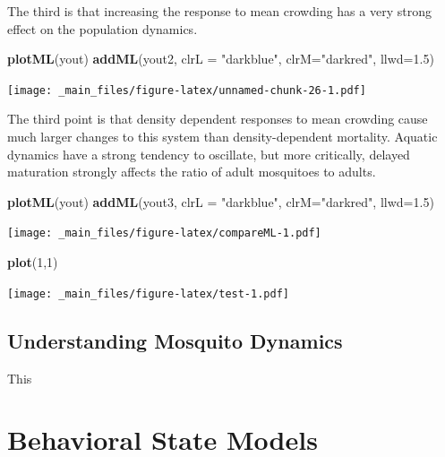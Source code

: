 \documentclass[
]{book}
\newenvironment{Shaded}{\begin{snugshade}}{\end{snugshade}}
\newcommand{\AttributeTok}[1]{\textcolor[rgb]{0.13,0.29,0.53}{#1}}
\newcommand{\DecValTok}[1]{\textcolor[rgb]{0.00,0.00,0.81}{#1}}
\newcommand{\FloatTok}[1]{\textcolor[rgb]{0.00,0.00,0.81}{#1}}
\newcommand{\FunctionTok}[1]{\textcolor[rgb]{0.13,0.29,0.53}{\textbf{#1}}}
\newcommand{\NormalTok}[1]{#1}
\newcommand{\StringTok}[1]{\textcolor[rgb]{0.31,0.60,0.02}{#1}}
\begin{document}
The third is that increasing the response to mean crowding has a very strong effect on the population dynamics.

\begin{Shaded}
\begin{Highlighting}[]
\FunctionTok{plotML}\NormalTok{(yout)}
\FunctionTok{addML}\NormalTok{(yout2, }\AttributeTok{clrL =} \StringTok{"darkblue"}\NormalTok{, }\AttributeTok{clrM=}\StringTok{"darkred"}\NormalTok{, }\AttributeTok{llwd=}\FloatTok{1.5}\NormalTok{)}
\end{Highlighting}
\end{Shaded}

\texttt{[image: \_main\_files/figure-latex/unnamed-chunk-26-1.pdf]}

The third point is that density dependent responses to mean crowding cause much larger changes to this system than density-dependent mortality. Aquatic dynamics have a strong tendency to oscillate, but more critically, delayed maturation strongly affects the ratio of adult mosquitoes to adults.

\begin{Shaded}
\begin{Highlighting}[]
\FunctionTok{plotML}\NormalTok{(yout)}
\FunctionTok{addML}\NormalTok{(yout3, }\AttributeTok{clrL =} \StringTok{"darkblue"}\NormalTok{, }\AttributeTok{clrM=}\StringTok{"darkred"}\NormalTok{, }\AttributeTok{llwd=}\FloatTok{1.5}\NormalTok{)}
\end{Highlighting}
\end{Shaded}

\texttt{[image: \_main\_files/figure-latex/compareML-1.pdf]}

\begin{Shaded}
\begin{Highlighting}[]
\FunctionTok{plot}\NormalTok{(}\DecValTok{1}\NormalTok{,}\DecValTok{1}\NormalTok{)}
\end{Highlighting}
\end{Shaded}

\texttt{[image: \_main\_files/figure-latex/test-1.pdf]}

\hypertarget{understanding-mosquito-dynamics}{%
\section{Understanding Mosquito Dynamics}\label{understanding-mosquito-dynamics}}

This

\hypertarget{behavioral-state-models}{%
\chapter{Behavioral State Models}\label{behavioral-state-models}}
\end{document}
